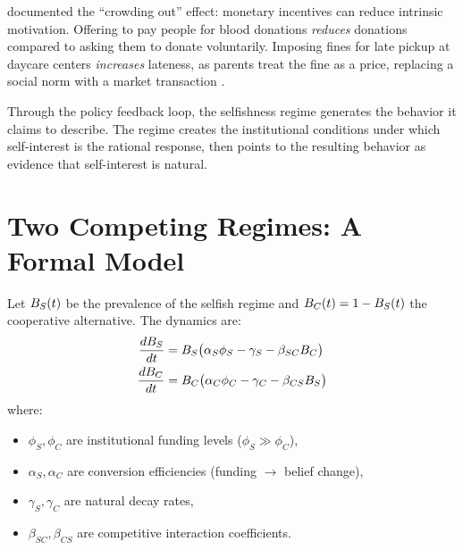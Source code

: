 \textcite{frey1997} documented the ``crowding out'' effect: monetary incentives can reduce intrinsic motivation.
Offering to pay people for blood donations \emph{reduces} donations compared to asking them to donate voluntarily.
Imposing fines for late pickup at daycare centers \emph{increases} lateness, as parents treat the fine as a price, replacing a social norm with a market transaction \autocite{gneezy2000}.

Through the policy feedback loop, the selfishness regime generates the behavior it claims to describe.
The regime creates the institutional conditions under which self-interest is the rational response, then points to the resulting behavior as evidence that self-interest is natural.

\section{Two Competing Regimes: A Formal Model}
\label{sec:ch21-competition}

\begin{model}
\label{mod:regime-competition}
Let $B_{S}(t)$ be the prevalence of the selfish regime and $B_{C}(t) = 1 - B_{S}(t)$ the cooperative alternative.
The dynamics are:
\begin{align}
  \frac{dB_{S}}{dt} &= B_{S}\bigl(\alpha_S \phi_S - \gamma_S - \beta_{SC}B_{C}\bigr) \\
  \frac{dB_{C}}{dt} &= B_{C}\bigl(\alpha_C \phi_C - \gamma_C - \beta_{CS}B_{S}\bigr)
\end{align}
where:
\begin{itemize}[nosep]
  \item $\phi_S, \phi_C$ are institutional funding levels ($\phi_S \gg \phi_C$),
  \item $\alpha_S, \alpha_C$ are conversion efficiencies (funding $\to$ belief change),
  \item $\gamma_S, \gamma_C$ are natural decay rates,
  \item $\beta_{SC}, \beta_{CS}$ are competitive interaction coefficients.
\end{itemize}
\end{model}

